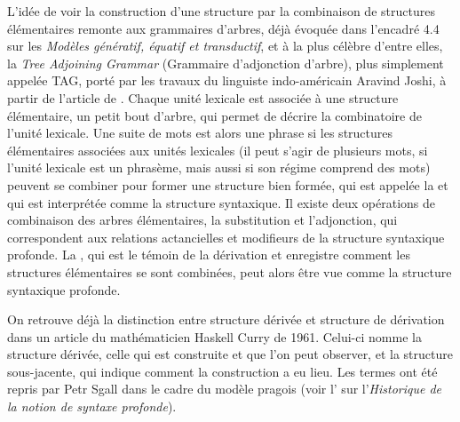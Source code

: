{L’idée de voir la construction d’une structure par la combinaison de structures élémentaires remonte aux grammaires d’arbres, déjà évoquée dans l’encadré 4.4 sur les \textit{Modèles génératif, équatif et transductif}, et à la plus célèbre d’entre elles, la \textit{Tree Adjoining Grammar} (Grammaire d’adjonction d’arbre), plus simplement appelée TAG, porté par les travaux du linguiste indo-américain Aravind Joshi, à partir de l’article de . Chaque unité lexicale est associée à une structure élémentaire, un petit bout d’arbre, qui permet de décrire la combinatoire de l’unité lexicale. Une suite de mots est alors une phrase si les structures élémentaires associées aux unités lexicales (il peut s’agir de plusieurs mots, si l’unité lexicale est un phrasème, mais aussi si son régime comprend des mots) peuvent se combiner pour former une structure bien formée, qui est appelée la  et qui est interprétée comme la structure syntaxique.  Il existe deux opérations de combinaison des arbres élémentaires, la substitution et l’adjonction, qui correspondent aux relations actancielles et modifieurs de la structure syntaxique profonde. La , qui est le témoin de la dérivation et enregistre comment les structures élémentaires se sont combinées, peut alors être vue comme la structure syntaxique profonde. 

On retrouve déjà la distinction entre structure dérivée et structure de dérivation dans un article du mathématicien Haskell Curry de 1961. Celui-ci nomme  la structure dérivée, celle qui est construite et que l’on peut observer, et  la structure sous-jacente, qui indique comment la construction a eu lieu. Les termes ont été repris par Petr Sgall dans le cadre du modèle pragois (voir l’ sur l’\textit{Historique de la notion de syntaxe profonde}).

}
